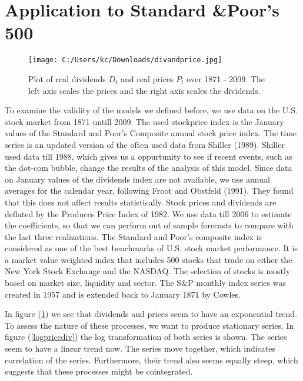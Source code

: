 \documentclass{article}
\begin{document}
\newpage
\section{Application to Standard \&Poor's 500}


\begin{figure}[h!]
	\centering
		\texttt{[image: C:/Users/kc/Downloads/divandprice.jpg]}
	\caption{Plot of real dividends $D_t$ and real prices $P_t$ over 1871 - 2009. The left axis scales the prices and the right axis scales the dividends.}
	\label{pricediv}
\end{figure}

To examine the validity of the models we defined before, we use data on the U.S. stock market from 1871 untill 2009. The used stockprice index is the January values of the Standard and Poor's Composite annual stock price index. The time series is an updated version of the often used data from Shiller (1989). Shiller used data till 1988, which gives us a oppurtunity to see if recent events, such as the dot-com bubble, change the results of the analysis of this model. Since data on January values of the dividends index are not available, we use annual averages for the calendar year, following Froot and Obstfeld (1991). They found that this does not affect results statistically\footnotemark. Stock prices and dividends are deflated by the Produces Price Index of 1982.  We use data till 2006 to estimate the coefficients, so that we can perform out of sample forecasts to compare with the last three realizations. 
The Standard and Poor's composite index is considered as one of the best benchmarks of U.S. stock market performance. It is a market value weighted index that includes 500 stocks that trade on either the New York Stock Exchange and the NASDAQ. The selection of stocks is mostly based on market size, liquidity and sector. The S$\&$P monthly index series was created in 1957 and is extended back to January 1871 by Cowles. 
\

In figure (\ref{pricediv}) we see that dividends and prices seem to have an exponential trend. To assess the nature of these processes, we want to produce stationary series. In figure (\ref{logpricediv}) the log transformation of both series is shown. The series seem to have a linear trend now. The series move together, which indicates correlation of the series. Furthermore, their trend also seems equally steep, which suggests that these processes might be cointegrated.
\end{document}
